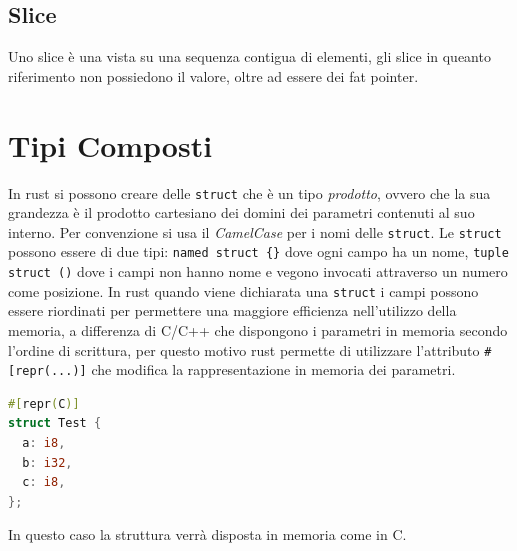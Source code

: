 \documentclass[12pt]{article}
\begin{document}
\subsection{Slice}
Uno slice \`e una vista su una sequenza contigua di elementi, gli slice in queanto riferimento non possiedono il valore, oltre ad essere dei fat pointer.



\newpage
\section{Tipi Composti}
In rust si possono creare delle \texttt{struct} che \`e un tipo \emph{prodotto}, ovvero che la sua grandezza \`e il prodotto cartesiano dei domini dei parametri contenuti al suo interno. Per convenzione si usa il \emph{CamelCase} per i nomi delle \texttt{struct}. Le \texttt{struct} possono essere di due tipi: \verb|named struct {}| dove ogni campo ha un nome, \texttt{tuple struct ()} dove i campi non hanno nome e vegono invocati attraverso un numero come posizione. In rust quando viene dichiarata una \texttt{struct} i campi possono essere riordinati per permettere una maggiore efficienza nell'utilizzo della memoria, a differenza di C/C++ che dispongono i parametri in memoria secondo l'ordine di scrittura, per questo motivo rust permette di utilizzare l'attributo \verb|#[repr(...)]| che modifica la rappresentazione in memoria dei parametri.
\begin{lstlisting}[language=rust]
#[repr(C)]
struct Test {
  a: i8,
  b: i32,
  c: i8,
};
\end{lstlisting}
In questo caso la struttura verr\`a disposta in memoria come in C.
\end{document}
